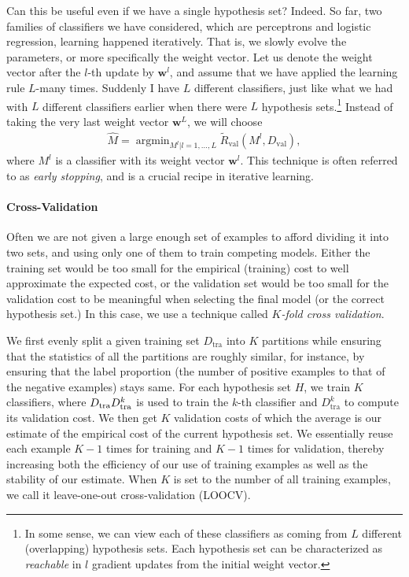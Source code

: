 \documentclass{report}
\newcommand{\vect}[1]{\mathbf{#1}}
\newcommand{\vw}[0]{\vect{w}}
\DeclareMathOperator*{\argmin}{\arg \min}
\newcommand{\val}{\text{val}}
\newcommand{\tra}{\text{tra}}
\begin{document}
Can this be useful even if we have a single hypothesis set? Indeed. So far, two
families of classifiers we have considered, which are perceptrons and logistic
regression, learning happened iteratively. That is, we slowly evolve the
parameters, or more specifically the weight vector. Let us denote the weight
vector after the $l$-th update by $\vw^l$, and assume that we have applied the
learning rule $L$-many times. Suddenly I have $L$ different classifiers, just
like what we had with $L$ different classifiers earlier when there were $L$
hypothesis sets.\footnote{
    In some sense, we can view each of these classifiers as coming from $L$
    different (overlapping) hypothesis sets. Each hypothesis set can be
    characterized as {\it reachable} in $l$ gradient updates from the initial
    weight vector.
}
Instead of taking the very last weight vector $\vw^L$, we will choose
\begin{align*}
    \hat{M} = \argmin_{M^l|l=1, \ldots, L} \tilde{R}_{\val}(M^l, D_{\val}),
\end{align*}
where $M^l$ is a classifier with its weight vector $\vw^l$. This technique is
often referred to as {\it early stopping}, and is a crucial recipe in iterative
learning. 

\paragraph{Cross-Validation}

Often we are not given a large enough set of examples to afford dividing it into
two sets, and using only one of them to train competing models. Either the
training set would be too small for the empirical (training) cost to well
approximate the expected cost, or the validation set would be too small for the
validation cost to be meaningful when selecting the final model (or the correct
hypothesis set.) In this case, we use a technique called {\it $K$-fold cross
validation}. 

We first evenly split a given training set $D_{\tra}$ into $K$ partitions while
ensuring that the statistics of all the partitions are roughly similar, for
instance, by ensuring that the label proportion (the number of positive examples
to that of the negative examples) stays same. For each hypothesis set $H$, we
train $K$ classifiers, where $D_{\tra} \\ D_{\tra}^k$ is used to train the
$k$-th classifier and $D_{\tra}^k$ to compute its validation cost. We then get
$K$ validation costs of which the average is our estimate of the empirical cost
of the current hypothesis set. We essentially reuse each example $K-1$ times for
training and $K-1$ times for validation, thereby increasing both the efficiency
of our use of training examples as well as the stability of our estimate.  When
$K$ is set to the number of all training examples, we call it leave-one-out
cross-validation (LOOCV). 
\end{document}
